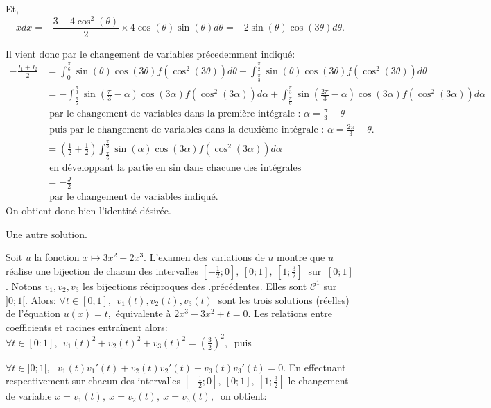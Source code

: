 Et, $$xdx=-\frac{3-4\cos^{2}(\theta)}{2}\times 4\cos(\theta)\sin(\theta)d\theta=-2\sin(\theta)\cos(3\theta)d\theta.$$

Il vient donc par le changement de variables précedemment indiqué:
\begin{align*}
-\frac{I_{1}+I_{2}}{2} & = \int_{0}^{\frac{\pi}{6}}\sin(\theta)\cos(3\theta)f(\cos^{2}(3\theta))d\theta+\int_{\frac{\pi}{3}}^{\frac{\pi}{2}}\sin(\theta)\cos(3\theta)f(\cos^{2}(3\theta))d\theta\\
& =-\int_{\frac{\pi}{6}}^{\frac{\pi}{3}}\sin(\frac{\pi}{3}-\alpha)\cos(3\alpha)f(\cos^{2}(3\alpha))d\alpha+ \int_{\frac{\pi}{6}}^{\frac{\pi}{3}}\sin(\frac{2\pi}{3}-\alpha)\cos(3\alpha)f(\cos^{2}(3\alpha))d\alpha\\
& \mbox{ par le changement de variables dans la première intégrale : } \alpha=\frac{\pi}{3}-\theta\\
& \mbox{ puis par le changement de variables dans la deuxième intégrale : } \alpha=\frac{2\pi}{3}-\theta.\\
& =(\frac{1}{2}+\frac{1}{2})\int_{\frac{\pi}{6}}^{\frac{\pi}{3}}\sin(\alpha)\cos(3\alpha)f(\cos^{2}(3\alpha))d\alpha\\
& \mbox{ en développant la partie en } \sin  \mbox{ dans chacune des intégrales}\\
& = -\frac{J}{2}\\
& \mbox{ par le changement de variables indiqué. }
\end{align*}
On obtient donc bien l'identité désirée.

$\underline { \text{Une autre solution}}$. %

Soit $u$ la fonction $x \longmapsto 3x^2 -2x^3.$ L'examen des variations de $u$ montre que $u$ réalise une bijection de chacun des intervalles
$[ -\frac {1}{2};0],\:[0;1],\:[1;\frac {3}{2}]\:$ sur $\: [0;1]$.
Notons $v_1,v_2,v_3$ les bijections réciproques des .précédentes. Elles sont  $\mathcal C ^1$ sur $]0;1[$.
Alors: $\forall t \in [0;1],\:\: v_1(t), v_2(t), v_3(t)\:$ sont les trois solutions (réelles) de l'équation $u(x) = t,$ équivalente à $2x^3 -3x^2 +t =0.$ 
Les relations entre coefficients et racines entraînent alors: $\forall t \in [0:1],\:\: v_1(t)^2 +v_2(t)^2 +v_3(t)^2 = \left(\frac 32\right) ^2,\:$ puis

$\forall t \in ]0;1[,\:\:\:  v_1(t)v_1'(t)+ v_2(t)v_2'(t) + v_3(t)v_3'(t) = 0.$ 
En effectuant respectivement sur chacun des intervalles $[-\frac12;0],\:[0;1],\: [1;\frac 32]$  le changement de variable $x=v_1(t),\:x=v_2(t),\:x=v_3(t),\:$  on obtient:

